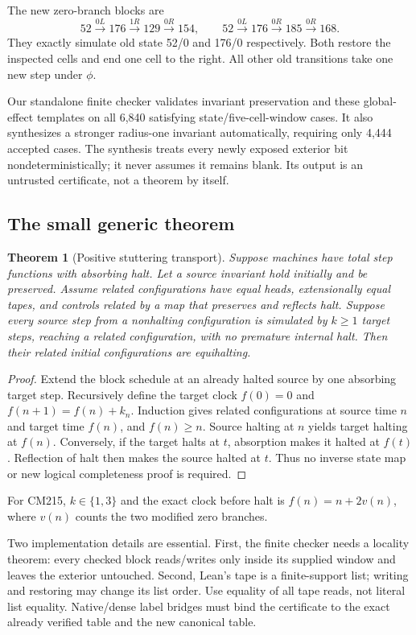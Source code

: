 \documentclass[11pt]{article}
\newtheorem{theorem}{Theorem}[section]
\begin{document}
The new zero-branch blocks are
\[
52\xrightarrow{0L}176\xrightarrow{1R}129\xrightarrow{0R}154,
\qquad
52\xrightarrow{0L}176\xrightarrow{0R}185\xrightarrow{0R}168.
\]
They exactly simulate old state 52/0 and 176/0 respectively. Both restore the inspected cells and end one cell to the right. All other old transitions take one new step under $\phi$.

Our standalone finite checker validates invariant preservation and these global-effect templates on all 6,840 satisfying state/five-cell-window cases. It also synthesizes a stronger radius-one invariant automatically, requiring only 4,444 accepted cases. The synthesis treats every newly exposed exterior bit nondeterministically; it never assumes it remains blank. Its output is an untrusted certificate, not a theorem by itself.

\subsection{The small generic theorem}
\begin{theorem}[Positive stuttering transport]
Suppose machines have total step functions with absorbing halt. Let a source invariant hold initially and be preserved. Assume related configurations have equal heads, extensionally equal tapes, and controls related by a map that preserves and reflects halt. Suppose every source step from a nonhalting configuration is simulated by $k\ge1$ target steps, reaching a related configuration, with no premature internal halt. Then their related initial configurations are equihalting.
\end{theorem}
\begin{proof}
Extend the block schedule at an already halted source by one absorbing target step. Recursively define the target clock $f(0)=0$ and $f(n+1)=f(n)+k_n$. Induction gives related configurations at source time $n$ and target time $f(n)$, and $f(n)\ge n$. Source halting at $n$ yields target halting at $f(n)$. Conversely, if the target halts at $t$, absorption makes it halted at $f(t)$. Reflection of halt then makes the source halted at $t$. Thus no inverse state map or new logical completeness proof is required.
\end{proof}
For CM215, $k\in\{1,3\}$ and the exact clock before halt is $f(n)=n+2v(n)$, where $v(n)$ counts the two modified zero branches.

Two implementation details are essential. First, the finite checker needs a locality theorem: every checked block reads/writes only inside its supplied window and leaves the exterior untouched. Second, Lean's tape is a finite-support list; writing and restoring may change its list order. Use equality of all tape reads, not literal list equality. Native/dense label bridges must bind the certificate to the exact already verified table and the new canonical table.
\end{document}
